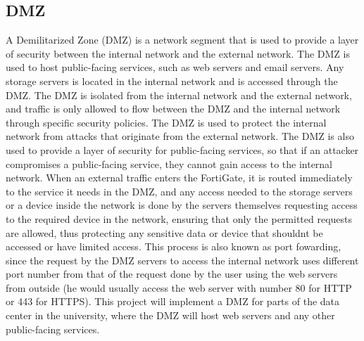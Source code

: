 \documentclass[12pt]{report}
\begin{document}
\subsection{DMZ}
A Demilitarized Zone (DMZ) is a network segment that is used to provide a layer of security between the internal network and the external network. The DMZ is used to host public-facing services, such as web servers and email servers. Any storage servers is located in the internal network and is accessed through the DMZ. The DMZ is isolated from the internal network and the external network, and traffic is only allowed to flow between the DMZ and the internal network through specific security policies. The DMZ is used to protect the internal network from attacks that originate from the external network. The DMZ is also used to provide a layer of security for public-facing services, so that if an attacker compromises a public-facing service, they cannot gain access to the internal network. When an external traffic enters the FortiGate, it is routed immediately to the service it needs in the DMZ, and any access needed to the storage servers or a device inside the network is done by the servers themselves requesting access to the required device in the network, ensuring that only the permitted requests are allowed, thus protecting any sensitive data or device that shouldnt be accessed or have limited access. This process is also known as port fowarding, since the request by the DMZ servers to access the internal network uses different port number from that of the request done by the user using the web servers from outside (he would usually access the web server with number 80 for HTTP or 443 for HTTPS). This project will implement a DMZ for parts of the data center in the university, where the DMZ will host web servers and any other public-facing services. \cite{DMZ} 
\end{document}
